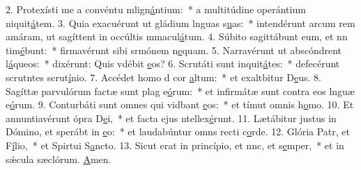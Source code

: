 2. Protexísti me a convéntu mlign\uline{á}ntium:~* a multitúdine operántium niquit\uline{á}tem.
3. Quia exacuérunt ut gládium lnguas s\uline{u}as:~* intendérunt arcum rem amáram, ut sagíttent in occúltis mmacul\uline{á}tum.
4. Súbito sagittábunt eum, et nn tim\uline{é}bunt:~* firmavérunt sibi srmónem n\uline{e}quam.
5. Narravérunt ut abscóndrent l\uline{á}queos:~* dixérunt: Quis vdébit \uline{e}os?
6. Scrutáti sunt inquit\uline{á}tes:~* defecérunt scrutntes scrut\uline{í}nio.
7. Accédet homo d cor \uline{a}ltum:~* et exaltbitur D\uline{e}us.
8. Sagíttæ parvulórum factæ sunt plag e\uline{ó}rum:~* et infirmátæ sunt contra eos lnguæ e\uline{ó}rum.
9. Conturbáti sunt omnes qui vidbant \uline{e}os:~* et tímut omnis h\uline{o}mo.
10. Et annuntiavérunt ópra D\uline{e}i,~* et facta ejus ntellex\uline{é}runt.
11. Lætábitur justus in Dómino, et sperábt in \uline{e}o:~* et laudabúntur omns recti c\uline{o}rde.
12. Glória Patr, et F\uline{í}lio,~* et Spirtui S\uline{a}ncto.
13. Sicut erat in princípio, et nnc, et s\uline{e}mper,~* et in sǽcula sæclórum. \uline{A}men.

